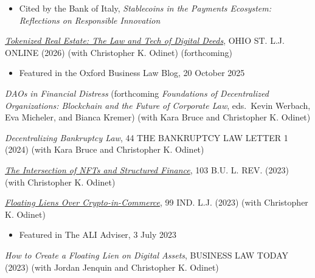 \documentclass[
  11pt,
  letterpaper]{article}
\begin{document}
\begin{itemize}
\item Cited by the Bank of Italy, \textit{Stablecoins in the Payments Ecosystem: Reflections on Responsible Innovation}
\end{itemize}

\vspace{0.5em}\noindent\href{https://www.andreatosato.com/essays/tokenized-real-estate}{\textit{Tokenized Real Estate: The Law and Tech of Digital Deeds}},
{\fontsize{9.5}{11}\selectfont\MakeUppercase{Ohio St. L.J. Online}}
(2026) (with Christopher K. Odinet) (forthcoming)

\begin{itemize}
\item Featured in the Oxford Business Law Blog, 20 October 2025
\end{itemize}

\vspace{0.5em}\noindent\textit{DAOs in Financial Distress} (forthcoming
\textit{Foundations of Decentralized Organizations: Blockchain and the Future of Corporate Law},
eds.~Kevin Werbach, Eva Micheler, and Bianca Kremer) (with Kara Bruce
and Christopher K. Odinet)

\vspace{0.5em}\noindent\textit{Decentralizing Bankruptcy Law}, 44
{\fontsize{9.5}{11}\selectfont\MakeUppercase{The Bankruptcy Law Letter}}
1 (2024) (with Kara Bruce and Christopher K. Odinet)

\vspace{0.5em}\noindent\href{https://www.andreatosato.com/essays/nfts-structured-finance}{\textit{The Intersection of NFTs and Structured Finance}},
103 {\fontsize{9.5}{11}\selectfont\MakeUppercase{B.U. L. Rev.}} (2023)
(with Christopher K. Odinet)

\vspace{0.5em}\noindent\href{https://www.andreatosato.com/essays/floating-liens-crypto}{\textit{Floating Liens Over Crypto-in-Commerce}},
99 {\fontsize{9.5}{11}\selectfont\MakeUppercase{Ind. L.J.}} (2023) (with
Christopher K. Odinet)

\begin{itemize}
\item Featured in The ALI Adviser, 3 July 2023
\end{itemize}

\vspace{0.5em}\noindent\textit{How to Create a Floating Lien on Digital Assets},
{\fontsize{9.5}{11}\selectfont\MakeUppercase{Business Law Today}} (2023)
(with Jordan Jenquin and Christopher K. Odinet)
\end{document}
